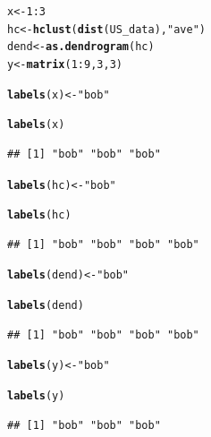 \documentclass[shortnames,nojss,article]{jss}\usepackage[]{graphicx}\usepackage[]{color}
\makeatletter
\newcommand{\hlnum}[1]{\textcolor[rgb]{0.686,0.059,0.569}{#1}}%
\newcommand{\hlstr}[1]{\textcolor[rgb]{0.192,0.494,0.8}{#1}}%
\newcommand{\hlopt}[1]{\textcolor[rgb]{0,0,0}{#1}}%
\newcommand{\hlstd}[1]{\textcolor[rgb]{0.345,0.345,0.345}{#1}}%
\newcommand{\hlkwb}[1]{\textcolor[rgb]{0.69,0.353,0.396}{#1}}%
\newcommand{\hlkwd}[1]{\textcolor[rgb]{0.737,0.353,0.396}{\textbf{#1}}}%
\newenvironment{kframe}{%
 \def\at@end@of@kframe{}%
 \ifinner\ifhmode%
  \def\at@end@of@kframe{\end{minipage}}%
  \begin{minipage}{\columnwidth}%
 \fi\fi%
 \def\FrameCommand##1{\hskip\@totalleftmargin \hskip-\fboxsep
 \colorbox{shadecolor}{##1}\hskip-\fboxsep
     \hskip-\linewidth \hskip-\@totalleftmargin \hskip\columnwidth}%
 \MakeFramed {\advance\hsize-\width
   \@totalleftmargin\z@ \linewidth\hsize
   \@setminipage}}%
 {\par\unskip\endMakeFramed%
 \at@end@of@kframe}
\newenvironment{knitrout}{}{} %
\makeatother
\begin{document}
\begin{knitrout}
\color{fgcolor}\begin{kframe}
\begin{alltt}
\hlstd{x} \hlkwb{<-} \hlnum{1}\hlopt{:}\hlnum{3}
\hlstd{hc} \hlkwb{<-} \hlkwd{hclust}\hlstd{(}\hlkwd{dist}\hlstd{(US_data),} \hlstr{"ave"}\hlstd{)}
\hlstd{dend} \hlkwb{<-} \hlkwd{as.dendrogram}\hlstd{(hc)}
\hlstd{y} \hlkwb{<-} \hlkwd{matrix}\hlstd{(}\hlnum{1}\hlopt{:}\hlnum{9}\hlstd{,} \hlnum{3}\hlstd{,} \hlnum{3}\hlstd{)}

\hlkwd{labels}\hlstd{(x)} \hlkwb{<-} \hlstr{"bob"}
\end{alltt}


{\ttfamily\noindent\color{warningcolor}{\#\# Warning: The lengths of the new labels is shorter than the length of the object - labels are recycled.}}\begin{alltt}
\hlkwd{labels}\hlstd{(x)}
\end{alltt}
\begin{verbatim}
## [1] "bob" "bob" "bob"
\end{verbatim}
\begin{alltt}
\hlkwd{labels}\hlstd{(hc)} \hlkwb{<-} \hlstr{"bob"}
\end{alltt}


{\ttfamily\noindent\color{warningcolor}{\#\# Warning: The lengths of the new labels is shorter than the number of leaves in the hclust - labels are recycled.}}\begin{alltt}
\hlkwd{labels}\hlstd{(hc)}
\end{alltt}
\begin{verbatim}
## [1] "bob" "bob" "bob" "bob"
\end{verbatim}
\begin{alltt}
\hlkwd{labels}\hlstd{(dend)} \hlkwb{<-} \hlstr{"bob"}
\end{alltt}


{\ttfamily\noindent\color{warningcolor}{\#\# Warning: The lengths of the new labels is shorter than the number of leaves in the dendrogram - labels are recycled.}}\begin{alltt}
\hlkwd{labels}\hlstd{(dend)}
\end{alltt}
\begin{verbatim}
## [1] "bob" "bob" "bob" "bob"
\end{verbatim}
\begin{alltt}
\hlkwd{labels}\hlstd{(y)} \hlkwb{<-} \hlstr{"bob"}
\end{alltt}


{\ttfamily\noindent\color{warningcolor}{\#\# Warning: The lengths of the new labels is shorter than the length of the object's colnames - labels are recycled.}}\begin{alltt}
\hlkwd{labels}\hlstd{(y)}
\end{alltt}
\begin{verbatim}
## [1] "bob" "bob" "bob"
\end{verbatim}
\end{kframe}
\end{knitrout}
\end{document}
